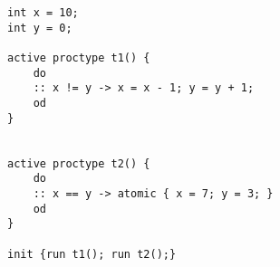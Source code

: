 \begin{lstlisting}[language=Promela]
int x = 10;
int y = 0;

active proctype t1() {
    do 
    :: x != y -> x = x - 1; y = y + 1; 
    od
}


active proctype t2() {
    do 
    :: x == y -> atomic { x = 7; y = 3; }
    od
}

init {run t1(); run t2();}
\end{lstlisting}
